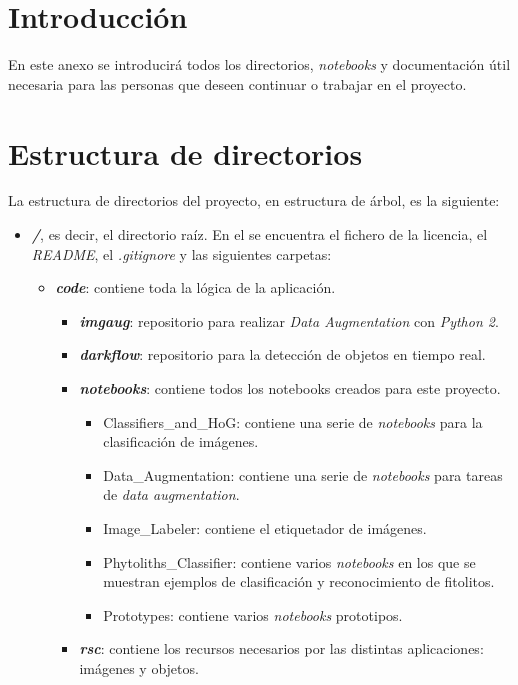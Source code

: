 
\section{Introducción}
En este anexo se introducirá todos los directorios, \textit{notebooks} y documentación útil necesaria para las personas que deseen continuar o trabajar en el proyecto.

\section{Estructura de directorios}
La estructura de directorios del proyecto, en estructura de árbol, es la siguiente:

\begin{itemize}
	\item \textit{\textbf{/}}, es decir, el directorio raíz. En el se encuentra el fichero de la licencia, el \textit{README}, el \textit{.gitignore} y las siguientes carpetas:
	\begin{itemize}
		\item \textit{\textbf{code}}: contiene toda la lógica de la aplicación.
			\begin{itemize}
				\item \textit{\textbf{imgaug}}: repositorio para realizar \textit{Data Augmentation} con \textit{Python 2}.
				\item \textit{\textbf{darkflow}}: repositorio para la detección de objetos en tiempo real.
				\item \textit{\textbf{notebooks}}: contiene todos los notebooks creados para este proyecto.
				\begin{itemize}
					\item Classifiers\_and\_HoG: contiene una serie de \textit{notebooks} para la clasificación de imágenes.
					\item Data\_Augmentation: contiene una serie de \textit{notebooks} para tareas de \textit{data augmentation}.
					\item Image\_Labeler: contiene el etiquetador de imágenes.
					\item Phytoliths\_Classifier: contiene varios \textit{notebooks} en los que se muestran ejemplos de clasificación y reconocimiento de fitolitos.
					\item Prototypes: contiene varios \textit{notebooks} prototipos.
				\end{itemize}
				\item \textit{\textbf{rsc}}: contiene los recursos necesarios por las distintas aplicaciones: imágenes y objetos. 

\end{itemize}
\end{itemize}
\end{itemize}
